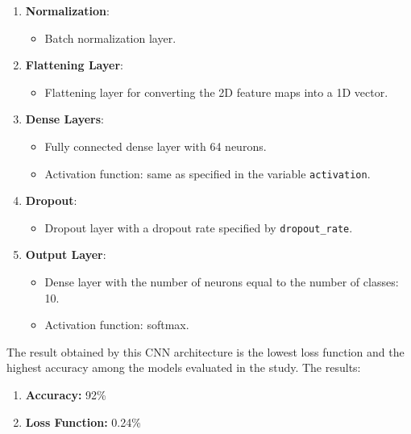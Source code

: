 \documentclass{article}
\begin{document}
\begin{enumerate}
    \item \textbf{Normalization}:
          \begin{itemize}
              \item Batch normalization layer.
          \end{itemize}

    \item \textbf{Flattening Layer}:
          \begin{itemize}
              \item Flattening layer for converting the 2D feature maps into a 1D vector.
          \end{itemize}

    \item \textbf{Dense Layers}:
          \begin{itemize}
              \item Fully connected dense layer with 64 neurons.
              \item Activation function: same as specified in the variable \texttt{activation}.
          \end{itemize}

    \item \textbf{Dropout}:
          \begin{itemize}
              \item Dropout layer with a dropout rate specified by \texttt{dropout\_rate}.
          \end{itemize}

    \item \textbf{Output Layer}:
          \begin{itemize}
              \item Dense layer with the number of neurons equal to the number of classes: 10.
              \item Activation function: softmax.
          \end{itemize}
\end{enumerate}

The result obtained by this CNN architecture is the lowest loss function and the highest accuracy among the models evaluated in the study.
The results:
\begin{enumerate}
    \item \textbf{Accuracy: } 92\%

    \item \textbf{Loss Function: } 0.24\%

\end{enumerate}
\end{document}
